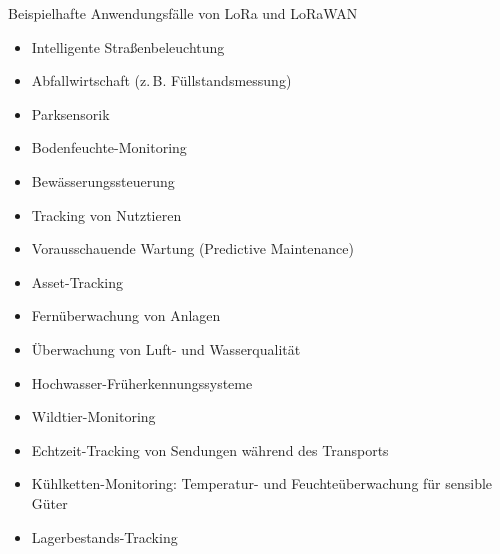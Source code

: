 \begin{frame}{Beispielhafte Anwendungsfälle von LoRa und LoRaWAN}
    \begin{description}
        \item[Smart Cities]
            \begin{itemize}
\item Intelligente Straßenbeleuchtung
\item Abfallwirtschaft (z.\,B. Füllstandsmessung)
\item Parksensorik
            \end{itemize}
        \item[Landwirtschaft]
            \begin{itemize}
\item Bodenfeuchte-Monitoring
\item Bewässerungssteuerung
\item Tracking von Nutztieren
            \end{itemize}
        \item[Industrielles IoT (IIoT)]
            \begin{itemize}
\item Vorausschauende Wartung (Predictive Maintenance)
\item Asset-Tracking
\item Fernüberwachung von Anlagen
            \end{itemize}
        \item[Umweltmonitoring]
            \begin{itemize}
\item Überwachung von Luft- und Wasserqualität
\item Hochwasser-Früherkennungssysteme
\item Wildtier-Monitoring
            \end{itemize}
        \item[Lieferkette und Logistik]
            \begin{itemize}
\item Echtzeit-Tracking von Sendungen während des Transports
\item Kühlketten-Monitoring: Temperatur- und Feuchteüberwachung für sensible Güter
\item Lagerbestands-Tracking
            \end{itemize}
    \end{description}
\end{frame}
